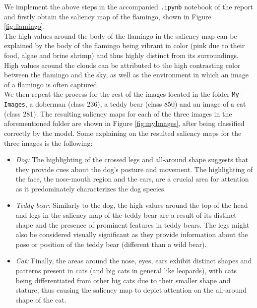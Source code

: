 \documentclass{article}
\def\code#1{\texttt{#1}}
\begin{document}
    We implement the above steps in the accompanied \code{.ipynb} notebook of the report and firstly obtain the saliency map of the flamingo, shown in Figure \ref{fig:flamingo}. \\
    
    The high values around the body of the flamingo in the saliency map can be explained by the body of the flamingo being vibrant in color (pink due to their food, algae and brine shrimp) and thus highly distinct from its surroundings. High values around the clouds can be attributed to the high contrasting color between the flamingo and the sky, as well as the environment in which an image of a flamingo is often captured. \\
    
    We then repeat the process for the rest of the images located in the folder \code{My-Images}, a doberman (class 236), a teddy bear (class 850) and an image of a cat (class 281). The resulting saliency maps for each of the three images in the aforementioned folder are shown in Figure \ref{fig:myImages}, after being classified correctly by the model. Some explaining on the resulted saliency maps for the three images is the following:
    
    \begin{itemize}
    	\item \textit{Dog:} The highlighting of the crossed legs and all-around shape suggests that they provide cues about the dog's posture and movement. The highlighting of the face, the nose-mouth region and the ears, are a crucial area for attention as it predominately characterizes the dog species.
    	
    	\item \textit{Teddy bear:} Similarly to the dog, the high values around the top of the head and legs in the saliency map of the teddy bear are a result of its distinct shape and the presence of prominent features in teddy bears. The legs might also be considered visually significant as they provide information about the pose or position of the teddy bear (different than a wild bear).
    	
    	\item \textit{Cat:} Finally, the areas around the nose, eyes, ears exhibit distinct shapes and patterns present in cats (and big cats in general like leopards), with cats being differentiated from other big cats due to their smaller shape and stature, thus causing the saliency map to depict attention on the all-around shape of the cat.
    	
    \end{itemize}
    
\end{document}
